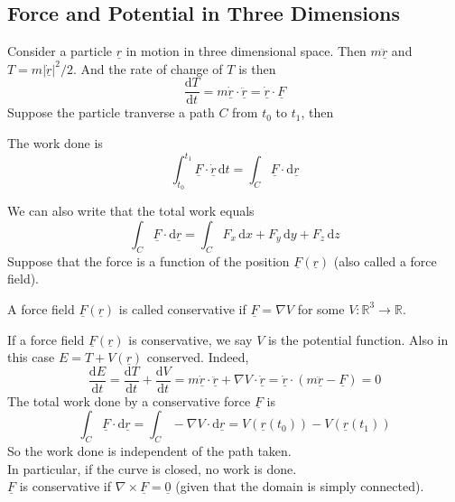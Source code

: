 \subsection{Force and Potential in Three Dimensions}
Consider a particle $\underline{r}$ in motion in three dimensional space.
Then $m\underline{\ddot{r}}$ and $T=m|\underline{\dot{r}}|^2/2$.
And the rate of change of $T$ is then
$$\frac{\mathrm dT}{\mathrm dt}=m\underline{\dot{r}}\cdot\underline{\ddot{r}}=\underline{\dot{r}}\cdot\underline{F}$$
Suppose the particle tranverse a path $C$ from $t_0$ to $t_1$, then
\begin{definition}
    The work done is
    $$\int_{t_0}^{t_1}\underline{F}\cdot\underline{\dot{r}}\,\mathrm dt=\int_C\underline{F}\cdot\mathrm d\underline{r}$$
\end{definition}
We can also write that the total work equals
$$\int_C\underline{F}\cdot\mathrm d\underline{r}=\int_C F_x\,\mathrm dx+F_y\,\mathrm dy+F_z\,\mathrm dz$$
Suppose that the force is a function of the position $\underline{F}(\underline{r})$ (also called a force field).
\begin{definition}
    A force field $\underline{F}(\underline{r})$ is called conservative if $\underline{F}=\nabla V$ for some $V:\mathbb R^3\to\mathbb R$.
\end{definition}
If a force field $\underline{F}(\underline{r})$ is conservative, we say $V$ is the potential function.
Also in this case $E=T+V(\underline{r})$ conserved.
Indeed,
$$\frac{\mathrm dE}{\mathrm dt}=\frac{\mathrm dT}{\mathrm dt}+\frac{\mathrm dV}{\mathrm dt}=m\underline{\dot{r}}\cdot\underline{\ddot{r}}+\nabla V\cdot\underline{\dot{r}}=\underline{\dot{r}}\cdot(m\underline{\ddot{r}}-\underline{F})=0$$
The total work done by a conservative force $\underline{F}$ is
$$\int_C\underline{F}\cdot\mathrm d\underline{r}=\int_C-\nabla V\cdot\mathrm d\underline{r}=V(\underline{r}(t_0))-V(\underline{r}(t_1))$$
So the work done is independent of the path taken.\\
In particular, if the curve is closed, no work is done.\\
$\underline{F}$ is conservative if $\nabla\times\underline{F}=\underline{0}$ (given that the domain is simply connected).
